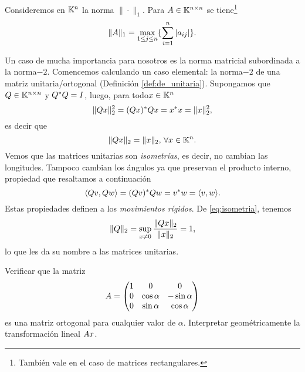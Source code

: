 \begin{ejemplo}
Consideremos en $\mathbb K^n$ la norma $\|\cdot\|_1$. Para $\Ab\in \Knn$ se tiene\footnote{También vale  en el caso de matrices rectangulares.}
\tcc
$$
 \|\Ab\|_1=\max_{1\le j\le n}\{\sum_{i=1}^{n} |a_{ij}|\}.
$$
\etcc
\end{ejemplo}
Un caso de mucha importancia para nosotros es la norma matricial subordinada a la norma$-2$.
Comencemos calculando un caso elemental: la norma$-2$ de una matriz unitaria/ortogonal (Definición \ref{def:de_unitaria}).
Supongamos que $\Qb\in \Knn$ y $\Qb^*\Qb=\Ib$, luego, para todo$\xb\in\Kn$
$$
\|\Qb\xb\|_2^2=(\Qb\xb)^*\Qb\xb=\xb^*\xb=\|\xb\|^2_2,
$$
es decir que
\begin{equation}
\label{eq:isometria}
\|\Qb\xb\|_2=\|\xb\|_2, \, \forall \xb\in \K^n.
\end{equation}
 Vemos que las matrices unitarias son \emph{isometrías}, es decir, no cambian las longitudes. Tampoco cambian los ángulos ya que preservan el producto interno, propiedad que resaltamos a continuación 
 \tcc
 \begin{equation}
 \label{eq:preservaPI}
\langle \Qb\vb,\Qb\wb \rangle=(\Qb\vb)^*\Qb\wb=\vb^*\wb=\langle \vb,\wb \rangle.
 \end{equation}
\etcc
Estas propiedades definen a los \emph{movimientos rígidos}. De \eqref{eq:isometria}, tenemos
$$
\|\Qb\|_2=\sup_{\xb\neq\cero}\frac{\|\Qb\xb\|_2}{\|\xb\|_2}=1,
$$
lo que les da su nombre a las matrices unitarias.
\begin{ej}Verificar que la matriz
$$
\Ab = \begin{pmatrix}
1 & 0 & 0 \\ 0 & \cos \alpha & -\sin \alpha \\ 0 & \sin \alpha & \cos \alpha
\end{pmatrix}
$$
es una matriz ortogonal para cualquier valor de $\alpha$. Interpretar geométricamente la transformación lineal $\Ab\xb$.
\end{ej}

